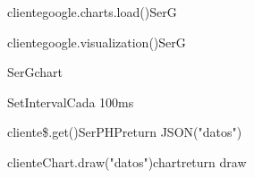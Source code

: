 


\begin {sequencediagram}


\begin{call}[2]{cliente}{google.charts.load()}{SerG}{}
\end{call}

\begin{call}{cliente}{google.visualization()}{SerG}{}
	
	\begin{call}{SerG}{}{chart}{}
	\end{call}
\end{call}

\begin{sdblock}[blue!10]{SetInterval}{Cada 100ms}
	\begin{call} [2]{cliente}{\$.get()}{SerPHP}{return JSON("datos")}
	\end{call}
    \begin{call}[2]{cliente}{Chart.draw("datos")}{chart}{return draw}
	\end{call}
\end{sdblock}


\end {sequencediagram}